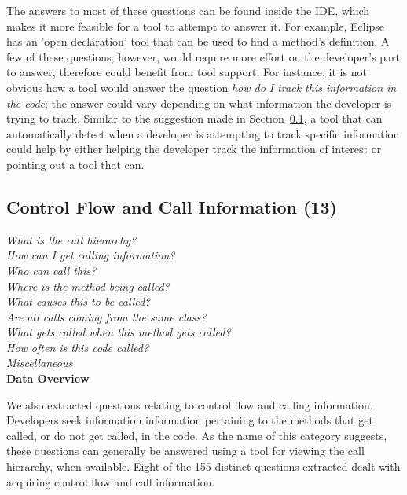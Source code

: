 \documentclass[conference]{IEEEtran}
\begin{document}
The answers to most of these questions can be found inside the IDE, which makes it more feasible for a tool to attempt to answer it. For example, Eclipse has an 'open declaration' tool that can be used to find a method's definition. A few of these questions, however, would require more effort on the developer's part to answer, therefore could benefit from tool support. For instance, it is not obvious how a tool would answer the question \emph{how do I track this information in the code}; the answer could vary depending on what information the developer is trying to track.
Similar to the suggestion made in Section~\ref{cf}, a tool that can automatically detect when a developer is attempting to track specific information could help by either helping the developer track the information of interest or pointing out a tool that can.



\noindent\subsection{\textbf{Control Flow and Call Information (13)}}\label{cf}

\noindent\emph{What is the call hierarchy?} \\
\emph{How can I get calling information?} \\
\emph{Who can call this?} \\
\emph{Where is the method being called?} \\
\emph{What causes this to be called?} \\
\emph{Are all calls coming from the same class?} \\
\emph{What gets called when this method gets called?} \\
\emph{How often is this code called?} \\
\emph{Miscellaneous} \\


\noindent\textbf{Data Overview}

We also extracted questions relating to control flow and calling information. 
Developers seek information information pertaining to the methods that get called, or do not get called, in the code. 
As the name of this category suggests, these questions can generally be answered using a tool for viewing the call hierarchy, when available. 
Eight of the 155 distinct questions extracted dealt with acquiring control flow and call information.
\\
\end{document}
